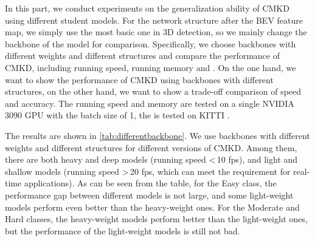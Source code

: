 \documentclass[runningheads]{llncs}
\begin{document}
In this part, we conduct experiments on the generalization ability of CMKD using different student models.
For the network structure after the BEV feature map, we simply use the most basic one in 3D detection, so we mainly change the backbone of the model for comparison.
Specifically, we choose backbones with different weights and different structures and compare the performance of CMKD, including running speed, running memory and .
On the one hand, we want to show the performance of CMKD using backbones with different structures, 
on the other hand, we want to show a trade-off comparison of speed and accuracy.
The running speed and memory are tested on a single NVIDIA 3090 GPU with the batch size of 1, the  is tested on KITTI .

The results are shown in \cref{tab:differentbackbone}.
We use backbones with different weights and different structures for different versions of CMKD. 
Among them, there are both heavy and deep models (running speed \textless \,10 fps), and light and shallow models (running speed \textgreater \,20 fps, which can meet the requirement for real-time applications). 
As can be seen from the table, for the Easy class, the performance gap between different models is not large, and some light-weight models perform even better than the heavy-weight ones.
For the Moderate and Hard classes, the heavy-weight models perform better than the light-weight ones, but the performance of the light-weight models is still not bad.


\begin{table}[t]
    \small
    \centering
        \caption{Generalization study of CMKD using backbones with different weights and different structures.}
    \label{tab:differentbackbone}
\end{table}
\end{document}
